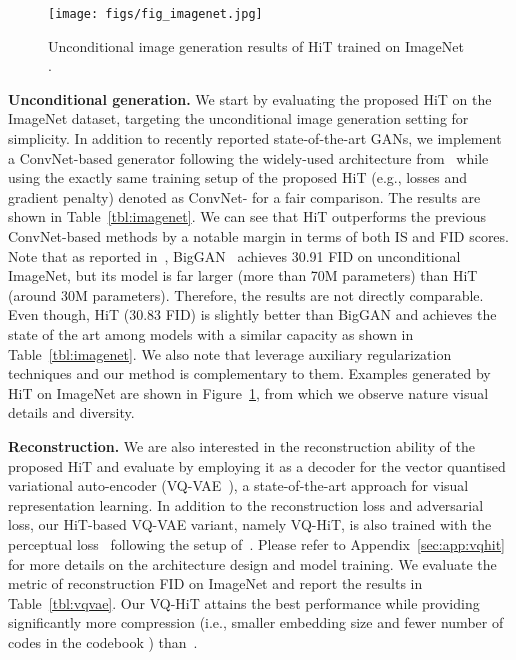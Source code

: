 \documentclass{article}
\newcommand{\app}[1]{#1}
\newcommand{\p}[1]{\textbf{#1.}}
\begin{document}
\begin{figure}[t]
  \centering
  \texttt{[image: figs/fig\_imagenet.jpg]}
  \vspace{-0.8em}
  \caption{Unconditional image generation results of HiT trained on ImageNet .}
  \label{fig:imagenet}
\end{figure}

\p{Unconditional generation} We start by evaluating the proposed HiT on the ImageNet  dataset, targeting the unconditional image generation setting for simplicity. In addition to recently reported state-of-the-art GANs, we implement a ConvNet-based generator following the widely-used architecture from~\cite{zhang2019self} while using the exactly same training setup of the proposed HiT (e.g., losses and  gradient penalty) denoted as ConvNet- for a fair comparison. The results are shown in Table~\ref{tbl:imagenet}. We can see that HiT outperforms the previous ConvNet-based methods by a notable margin in terms of both IS and FID scores. Note that as reported in~\cite{donahue2019large}, BigGAN~\cite{brock2019large} achieves 30.91 FID on unconditional ImageNet, but its model is far larger (more than 70M parameters) than HiT (around 30M parameters). Therefore, the results are not directly comparable. Even though, HiT (30.83 FID) is slightly better than BigGAN and achieves the state of the art among models with a similar capacity as shown in Table~\ref{tbl:imagenet}. We also note that \cite{chen2019self,liu2020diverse} leverage auxiliary regularization techniques and our method is complementary to them. Examples generated by HiT on ImageNet are shown in Figure~\ref{fig:imagenet}, from which we observe nature visual details and diversity.

\p{Reconstruction} We are also interested in the reconstruction ability of the proposed HiT and evaluate by employing it as a decoder for the vector quantised variational auto-encoder (VQ-VAE~\cite{van2017neural}), a state-of-the-art approach for visual representation learning. In addition to the reconstruction loss and adversarial loss, our HiT-based VQ-VAE variant, namely VQ-HiT, is also trained with the perceptual loss~\cite{johnson2016perceptual} following the setup of~\cite{esser2021taming,zhu2020domain}. Please refer to \app{Appendix~\ref{sec:app:vqhit}} for more details on the architecture design and model training. We evaluate the metric of reconstruction FID on ImageNet  and report the results in Table~\ref{tbl:vqvae}. Our VQ-HiT attains the best performance while providing significantly more compression (i.e., smaller embedding size and fewer number of codes in the codebook ) than~\cite{ramesh2021zero,razavi2019generating,van2017neural}.
\end{document}
